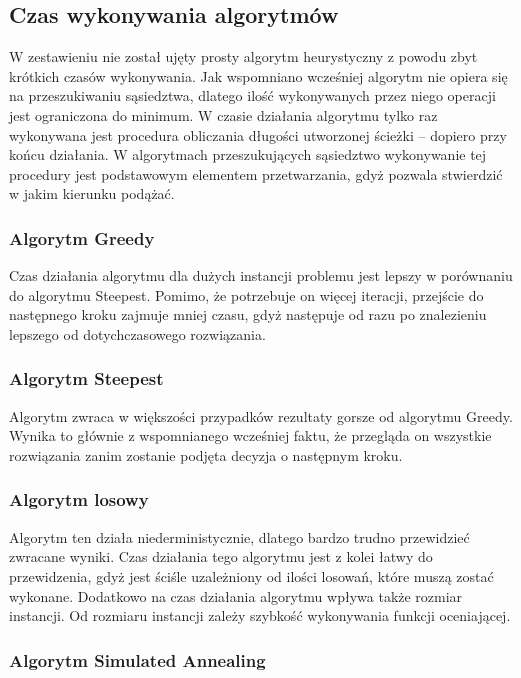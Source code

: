 \subsection{Czas wykonywania algorytmów}

W zestawieniu nie został ujęty prosty algorytm heurystyczny z
powodu zbyt krótkich czasów wykonywania. Jak wspomniano wcześniej
algorytm nie opiera się na przeszukiwaniu sąsiedztwa, dlatego
ilość wykonywanych przez niego operacji jest ograniczona do
minimum. W czasie działania algorytmu tylko raz wykonywana
jest procedura obliczania długości utworzonej ścieżki -- dopiero
przy końcu działania. W algorytmach przeszukujących sąsiedztwo
wykonywanie tej procedury jest podstawowym elementem przetwarzania,
gdyż pozwala stwierdzić w jakim kierunku podążać.


\subsubsection{Algorytm Greedy}

Czas działania algorytmu dla dużych instancji problemu jest lepszy
w porównaniu do algorytmu Steepest. Pomimo, że potrzebuje on
więcej iteracji, przejście do następnego kroku
zajmuje mniej czasu, gdyż następuje od razu po znalezieniu
lepszego od dotychczasowego rozwiązania.

\subsubsection{Algorytm Steepest}

Algorytm zwraca w większości przypadków rezultaty gorsze
od algorytmu Greedy. Wynika to głównie z wspomnianego
wcześniej faktu, że przegląda on
wszystkie rozwiązania zanim zostanie podjęta decyzja o następnym kroku.

\subsubsection{Algorytm losowy}

Algorytm ten działa niederministycznie, dlatego bardzo trudno
przewidzieć zwracane wyniki. Czas działania tego algorytmu
jest z kolei łatwy do przewidzenia, gdyż jest ściśle uzależniony
od ilości losowań, które muszą zostać wykonane. Dodatkowo na czas
działania algorytmu wpływa także rozmiar instancji. Od rozmiaru
instancji zależy szybkość wykonywania funkcji oceniającej.

\subsubsection {Algorytm Simulated Annealing}

